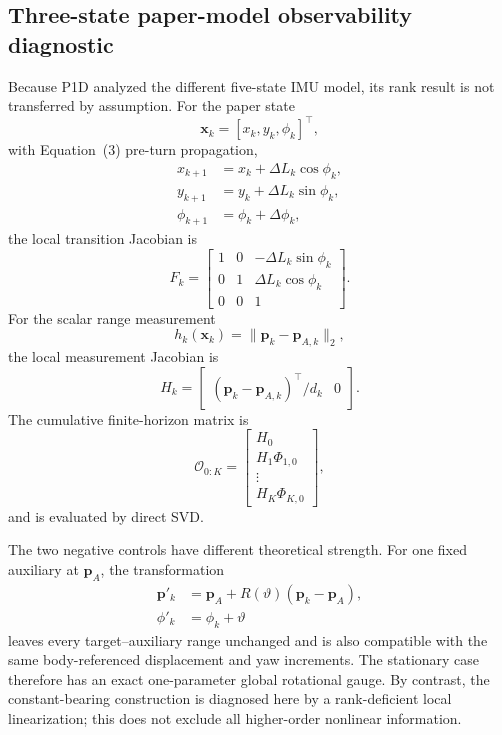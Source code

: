 \subsection{Three-state paper-model observability diagnostic}
Because P1D analyzed the different five-state IMU model, its rank result is not transferred by assumption. For the paper state
\begin{equation}
    \bm x_k=[x_k,y_k,\phi_k]^\top,
\end{equation}
with Equation~(3) pre-turn propagation,
\begin{align}
    x_{k+1} &= x_k+\Delta L_k\cos\phi_k,\\
    y_{k+1} &= y_k+\Delta L_k\sin\phi_k,\\
    \phi_{k+1} &= \phi_k+\Delta\phi_k,
\end{align}
the local transition Jacobian is
\begin{equation}
    F_k=
    \begin{bmatrix}
        1 & 0 & -\Delta L_k\sin\phi_k\\
        0 & 1 &  \Delta L_k\cos\phi_k\\
        0 & 0 & 1
    \end{bmatrix}.
\end{equation}
For the scalar range measurement
\begin{equation}
    h_k(\bm x_k)=\lVert\bm p_k-\bm p_{A,k}\rVert_2,
\end{equation}
the local measurement Jacobian is
\begin{equation}
    H_k=
    \begin{bmatrix}
        (\bm p_k-\bm p_{A,k})^\top/d_k & 0
    \end{bmatrix}.
\end{equation}
The cumulative finite-horizon matrix is
\begin{equation}
    \mathcal O_{0:K}=\begin{bmatrix}
        H_0\\
        H_1\Phi_{1,0}\\
        \vdots\\
        H_K\Phi_{K,0}
    \end{bmatrix},
\end{equation}
and is evaluated by direct SVD.

The two negative controls have different theoretical strength. For one fixed auxiliary at \(\bm p_A\), the transformation
\begin{align}
    \bm p'_k &= \bm p_A+R(\vartheta)(\bm p_k-\bm p_A),\\
    \phi'_k &= \phi_k+\vartheta
\end{align}
leaves every target--auxiliary range unchanged and is also compatible with the same body-referenced displacement and yaw increments. The stationary case therefore has an exact one-parameter global rotational gauge. By contrast, the constant-bearing construction is diagnosed here by a rank-deficient local linearization; this does not exclude all higher-order nonlinear information.

